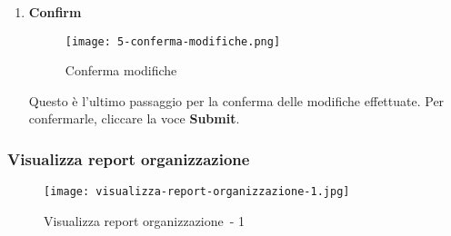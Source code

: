 \documentclass[../manuale-utente.tex]{subfiles}
\begin{document}
\begin{enumerate}
    \item \textbf{Confirm}

    \begin{figure}[H]
        \centering
        \texttt{[image: 5-conferma-modifiche.png]}
        \caption{Conferma modifiche}%
        \label{fig:web_app_conferma_modifiche}
    \end{figure}
    Questo è l'ultimo passaggio per la conferma delle modifiche effettuate. Per confermarle, cliccare la voce \textbf{Submit}.
\end{enumerate}

\subsubsection{Visualizza report organizzazione}%
\label{subs:visualizza_report_organizzazione}

\begin{figure}[H]
  \centering
  \texttt{[image: visualizza-report-organizzazione-1.jpg]}
  \caption{Visualizza report organizzazione~- 1}%
  \label{fig:web_app_visualizza-report-organizzazione-1}
\end{figure}
\end{document}

